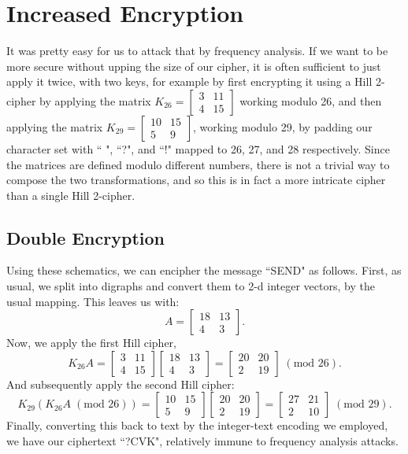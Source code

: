 \documentclass{article}
\begin{document}
\section{Increased Encryption}
It was pretty easy for us to attack that by frequency analysis. If we want to be more secure without upping the size of our cipher, it is often sufficient to just apply it twice, with two keys, for example by first encrypting it using a Hill 2-cipher by applying the matrix $K_{26} = \begin{bmatrix}
    3 & 11 \\
    4 & 15
\end{bmatrix}$ working modulo 26, and then applying the matrix $K_{29} = \begin{bmatrix}
    10 & 15 \\
    5 & 9
\end{bmatrix}$, working modulo 29, by padding our character set with `` ", ``?", and ``!" mapped to 26, 27, and 28 respectively. Since the matrices are defined modulo different numbers, there is not a trivial way to compose the two transformations, and so this is in fact a more intricate cipher than a single Hill 2-cipher.

\subsection{Double Encryption}
Using these schematics, we can encipher the message ``SEND" as follows. First, as usual, we split into digraphs and convert them to 2-d integer vectors, by the usual mapping. This leaves us with:
\[
    A = \begin{bmatrix}
        18 & 13 \\
        4 & 3
    \end{bmatrix}.
\]
Now, we apply the first Hill cipher,
\[
    K_{26} A = \begin{bmatrix}
        3 & 11 \\
        4 & 15
    \end{bmatrix} \begin{bmatrix}
        18 & 13 \\
        4 & 3
    \end{bmatrix} = \begin{bmatrix}
        20 & 20 \\
        2 & 19
    \end{bmatrix} \; (\text{mod } 26).
\]
And subsequently apply the second Hill cipher:
\[
    K_{29} (K_26 A \; (\text{mod } 26)) = \begin{bmatrix}
        10 & 15 \\
        5 & 9
    \end{bmatrix} \begin{bmatrix}
        20 & 20 \\
        2 & 19
    \end{bmatrix} = \begin{bmatrix}
        27 & 21 \\
        2 & 10
    \end{bmatrix} \; (\text{mod } 29).
\]
Finally, converting this back to text by the integer-text encoding we employed, we have our ciphertext ``?CVK", relatively immune to frequency analysis attacks.
\end{document}
